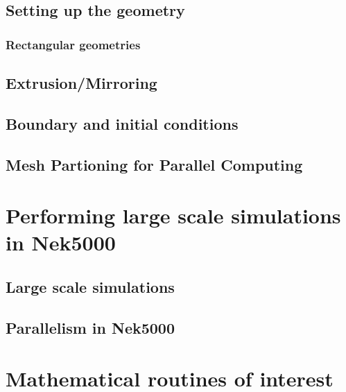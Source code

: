 \documentclass[11pt]{report}              %
\begin{document}
\section{Setting up the geometry}
\subsection{Rectangular geometries}
\label{sec:genbox}
%
\section{Extrusion/Mirroring}

\section{Boundary and initial conditions}



\section{Mesh Partioning for Parallel Computing}


\chapter{Performing large scale simulations  in Nek5000}
\section{Large scale simulations}

\section{Parallelism in Nek5000}


\chapter{Mathematical routines of interest}

\end{document}
